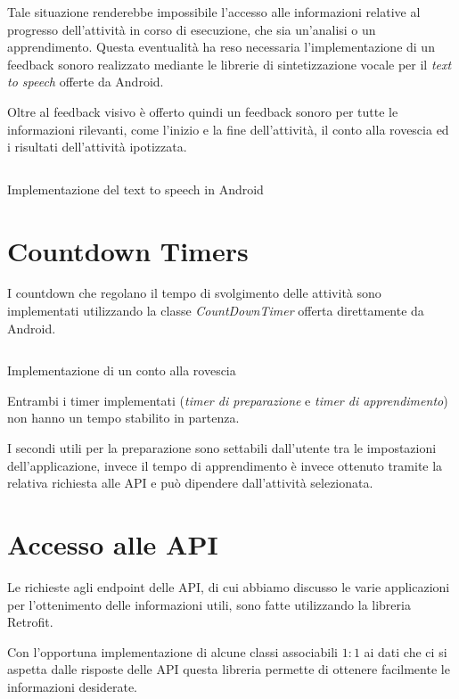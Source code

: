 Tale situazione renderebbe impossibile l'accesso alle informazioni relative al progresso dell'attività in corso di esecuzione, che sia 
un'analisi o un apprendimento.
Questa eventualità ha reso necessaria l'implementazione di un feedback sonoro realizzato mediante le librerie 
di sintetizzazione vocale per il \textit{text to speech} \cite{tts} offerte da Android.

Oltre al feedback visivo è offerto quindi un feedback sonoro per tutte le informazioni rilevanti, come l'inizio e la fine dell'attività, 
il conto alla rovescia ed i risultati dell'attività ipotizzata.

\begin{listing}[H] 
    \inputminted[frame=single,framesep=10pt]{java}{assets/snippets/app/voice.java}
    \caption{Implementazione del text to speech in Android}
\end{listing}



\section{Countdown Timers}
I countdown che regolano il tempo di svolgimento delle attività sono implementati utilizzando la 
classe \textit{CountDownTimer} \cite{countdown} offerta direttamente da Android.
\begin{listing}[H] 
    \inputminted[frame=single,framesep=10pt]{java}{assets/snippets/app/countdown.java}
    \caption{Implementazione di un conto alla rovescia}
\end{listing}
\noindent Entrambi i timer implementati (\textit{timer di preparazione} e \textit{timer di apprendimento}) non hanno un tempo stabilito in partenza. 

I secondi utili per la preparazione sono settabili dall'utente tra le impostazioni dell'applicazione, invece il tempo di 
apprendimento è invece ottenuto tramite la relativa richiesta alle API e può dipendere dall'attività selezionata.



\section{Accesso alle API}
Le richieste agli endpoint delle API, di cui abbiamo discusso le varie applicazioni per l'ottenimento delle informazioni utili, 
sono fatte utilizzando la libreria Retrofit. 

Con l'opportuna implementazione di alcune classi associabili $1:1$ ai dati che ci si aspetta dalle risposte delle API
questa libreria permette di ottenere facilmente le informazioni desiderate.


